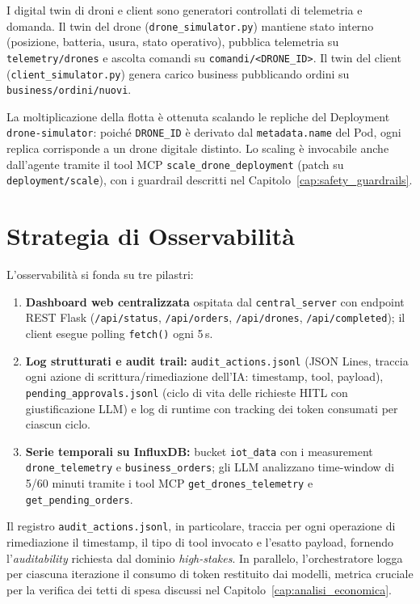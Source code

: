 I digital twin di droni e client sono generatori controllati di telemetria e domanda. Il twin del drone (\texttt{drone\_simulator.py}) mantiene stato interno (posizione, batteria, usura, stato operativo), pubblica telemetria su \texttt{telemetry/drones} e ascolta comandi su \texttt{comandi/<DRONE\_ID>}. Il twin del client (\texttt{client\_simulator.py}) genera carico business pubblicando ordini su \texttt{business/ordini/nuovi}.

La moltiplicazione della flotta è ottenuta scalando le repliche del Deployment \texttt{drone-simulator}: poiché \texttt{DRONE\_ID} è derivato dal \texttt{metadata.name} del Pod, ogni replica corrisponde a un drone digitale distinto. Lo scaling è invocabile anche dall'agente tramite il tool MCP \texttt{scale\_drone\_deployment} (patch su \texttt{deployment/scale}), con i guardrail descritti nel Capitolo~\ref{cap:safety_guardrails}.

\section{Strategia di Osservabilità}
\label{sec:osservabilita}

L'osservabilità si fonda su tre pilastri:
\begin{enumerate}
    \item \textbf{Dashboard web centralizzata} ospitata dal \texttt{central\_server} con endpoint REST Flask (\texttt{/api/status}, \texttt{/api/orders}, \texttt{/api/drones}, \texttt{/api/completed}); il client esegue polling \texttt{fetch()} ogni 5\,s.
    \item \textbf{Log strutturati e audit trail:} \texttt{audit\_actions.jsonl} (JSON Lines, traccia ogni azione di scrittura/rimediazione dell'IA: timestamp, tool, payload), \texttt{pending\_approvals.jsonl} (ciclo di vita delle richieste HITL con giustificazione LLM) e log di runtime con tracking dei token consumati per ciascun ciclo.
    \item \textbf{Serie temporali su InfluxDB:} bucket \texttt{iot\_data} con i measurement \texttt{drone\_telemetry} e \texttt{business\_orders}; gli LLM analizzano time-window di 5/60 minuti tramite i tool MCP \texttt{get\_drones\_telemetry} e \texttt{get\_pending\_orders}.
\end{enumerate}

Il registro \texttt{audit\_actions.jsonl}, in particolare, traccia per ogni operazione di rimediazione il timestamp, il tipo di tool invocato e l'esatto payload, fornendo l'\textit{auditability} richiesta dal dominio \textit{high-stakes}. In parallelo, l'orchestratore logga per ciascuna iterazione il consumo di token restituito dai modelli, metrica cruciale per la verifica dei tetti di spesa discussi nel Capitolo~\ref{cap:analisi_economica}.
